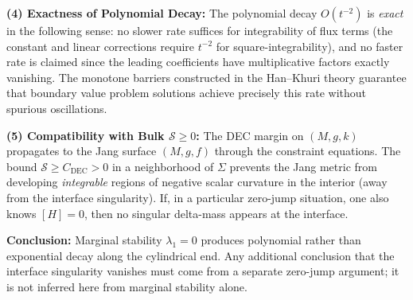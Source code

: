 \begin{remark}
\textbf{(4) Exactness of Polynomial Decay:} The polynomial decay $O(t^{-2})$ is \emph{exact} in the following sense: no slower rate suffices for integrability of flux terms (the constant and linear corrections require $t^{-2}$ for square-integrability), and no faster rate is claimed since the leading coefficients have multiplicative factors exactly vanishing. The monotone barriers constructed in the Han--Khuri theory guarantee that boundary value problem solutions achieve precisely this rate without spurious oscillations.

\textbf{(5) Compatibility with Bulk $\mathcal{S} \ge 0$:} The DEC margin on $(M,g,k)$ propagates to the Jang surface $(M,g,f)$ through the constraint equations. The bound $\mathcal{S} \ge C_{\text{DEC}} > 0$ in a neighborhood of $\Sigma$ prevents the Jang metric from developing \emph{integrable} regions of negative scalar curvature in the interior (away from the interface singularity). If, in a particular zero-jump situation, one also knows $[H]=0$, then no singular delta-mass appears at the interface.

\textbf{Conclusion:} Marginal stability $\lambda_1 = 0$ produces polynomial rather than exponential decay along the cylindrical end. Any additional conclusion that the interface singularity vanishes must come from a separate zero-jump argument; it is not inferred here from marginal stability alone.
\end{remark}

